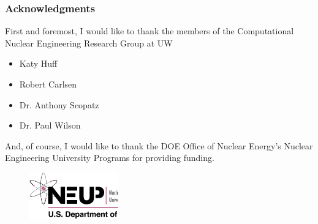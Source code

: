 \begin{frame}[ctb!]
  \frametitle{Acknowledgments}
  First and foremost, I would like to thank the members of the
  Computational Nuclear Engineering Research Group at UW 
  \begin{itemize}
    \item Katy Huff
    \item Robert Carlsen
    \item Dr. Anthony Scopatz
    \item Dr. Paul Wilson
  \end{itemize}

  \vspace{0.2cm}

  And, of course, I would like to thank the DOE Office of Nuclear Energy's 
  Nuclear Engineering University Programs for providing funding. 
  \begin{figure}[htbp!]
    \begin{center}
      \includegraphics[height=2cm]{neup.ps}
    \end{center}
    \label{fig:neup}
  \end{figure}
\end{frame}

